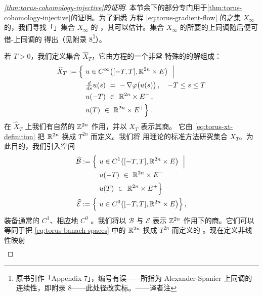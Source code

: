 \begin{proof}[\cref*{thm:torus-cohomology-injective}的证明]
本节余下的部分专门用于\cref{thm:torus-cohomology-injective}的证明。为了洞悉%
\trGradient{}方程 \eqref{eq:torus-gradient-flow} 的\trBounded\trOrbit{}之集%
$X_{\infty}$ 的\trTopology，我们寻找「\trApproximation」集合 $X_{\infty}$ 的%
\trSmooth\trCompact\trSubmanifold，其\trTopology{}可以估计。集合 $X_{\infty}$%
的所要的上同调随后便可借\trAlexander-\trSpanier{}上同调的\trContinuity{}%
得出（见附录 8\footnote{原书引作「Appendix 7」，编号有误——所指为 Alexander-Spanier 上同调的连续性，即附录 8——此处径改实标。——译者注}）。

若 $T>0$，我们定义集合 $\widehat{X}_{T}$，它由\trGradient{}方程的一个非常%
特殊的\trBoundaryValueProblem{}的解组成：
\begin{equation}\label{eq:torus-xt-definition}
\begin{aligned}
\widehat{X}_{T}:=\Bigl\{\ &u\in C^{\infty}\bigl([-T,T],\mathbb{R}^{2n}\times E\bigr)\ \Bigm|\\
&\tfrac{d}{ds}u(s)\ =\ -\,\nabla\varphi\bigl(u(s)\bigr)\,,\quad -T\leq s\leq T\\
&u(-T)\ \in\ \mathbb{R}^{2n}\times E^{-}\,,\\
&u(T)\ \in\ \mathbb{R}^{2n}\times E^{+}\Bigr\}\,.
\end{aligned}
\end{equation}
在 $\widehat{X}_{T}$ 上我们有自然的 $\mathbb{Z}^{2n}$ 作用，并以 $X_{T}$ 表示其商。%
它由 \eqref{eq:torus-xt-definition} 把 $\mathbb{R}^{2n}$ 换成 $T^{2n}$ 而定义。我们将%
用\trFredholm{}理论的标准方法研究集合 $X_{T}$。为此目的，我们引入\trBanach{}空间
\begin{equation}\label{eq:torus-banach-spaces}
\begin{aligned}
\widehat{\mathcal{B}}:=\Bigl\{\ &u\in C^{1}\bigl([-T,T],\mathbb{R}^{2n}\times E\bigr)\ \Bigm|\\
&u(-T)\ \in\ \mathbb{R}^{2n}\times E^{-}\\
&u(T)\ \in\ \mathbb{R}^{2n}\times E^{+}\Bigr\}\\
\widehat{\mathcal{E}}:=\Bigl\{\ &u\in C^{0}\bigl([-T,T],\mathbb{R}^{2n}\times E\bigr)\Bigr\}\,,
\end{aligned}
\end{equation}
装备通常的 $C^{1}$、相应地 $C^{0}$ \trNorm。我们将以 $\mathcal{B}$ 与%
$\mathcal{E}$ 表示 $\mathbb{Z}^{2n}$ 作用下的商。它们可以等同于把%
\eqref{eq:torus-banach-spaces} 中的 $\mathbb{R}^{2n}$ 换成 $T^{2n}$ 而定义的%
\trBanach\trManifold。现在定义非线性\trSmooth{}映射
\begin{equation}\label{eq:torus-fredholm-map}
\begin{gathered}

\end{gathered}
\end{equation}
\end{proof}
